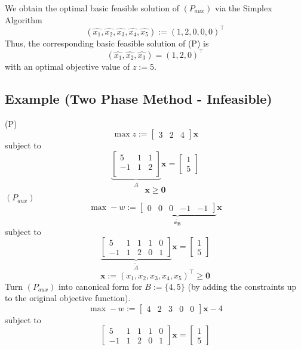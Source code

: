 We obtain the optimal basic feasible solution of $ (P_{aux}) $ via the Simplex
Algorithm
\[(\hat{x_1}, \hat{x_2}, \hat{x_3}, \hat{x_4}, \hat{x_5}):=
(1,2,0,0,0)^\top\]
Thus, the corresponding basic feasible solution of (P) is
\[(\hat{x_1}, \hat{x_2}, \hat{x_3})=(1,2,0)^\top\]
with an optimal objective value of $ z:= 5 $.

\subsection{Example (Two Phase Method - Infeasible)}
(P)
\[ \max z:=\begin{bmatrix} 3 & 2 & 4 \end{bmatrix} \bm{x} \]
subject to
\[
    \underbrace{
    \begin{bmatrix}
        5 & 1 & 1\\
        -1 & 1 & 2\\
    \end{bmatrix}}_{A}
    \bm{x}=
    \begin{bmatrix}
        1\\
        5
    \end{bmatrix}
\]
\[\bm{x}\ge \bm{0}\]
$ (P_{aux}) $ 
\[ \max -w:=\underbrace{\left[\begin{array}{ccccc}
0 & 0 & 0 & -1 & -1
\end{array}\right]}_{\bm{\tilde{c_B}}} \bm{x} \]
subject to
\[
    \underbrace{\left[
    \begin{array}{ccccc}
        5 & 1 & 1 & 1 & 0\\
        -1 & 1 & 2 & 0 & 1
    \end{array}\right]}_{\tilde{A}}
    \bm{x}=
    \begin{bmatrix}
        1\\
        5
    \end{bmatrix}
\]
\[ \bm{x}:=(x_1,x_2,x_3,x_4,x_5)^\top \ge \bm{0} \]
Turn $ (P_{aux}) $ into canonical form for $ B:=\{4,5\} $ (by adding
the constraints up to the original objective function).
\[ \max -w:=\left[\begin{array}{ccccc}
4 & 2 & 3 & 0 & 0
\end{array}\right] \bm{x} - 4 \]
subject to
\[
    \left[
    \begin{array}{ccccc}
        5 & 1 & 1 & 1 & 0\\
        -1 & 1 & 2 & 0 & 1
    \end{array}\right]
    \bm{x}=
    \begin{bmatrix}
        1\\
        5
    \end{bmatrix}
\]
